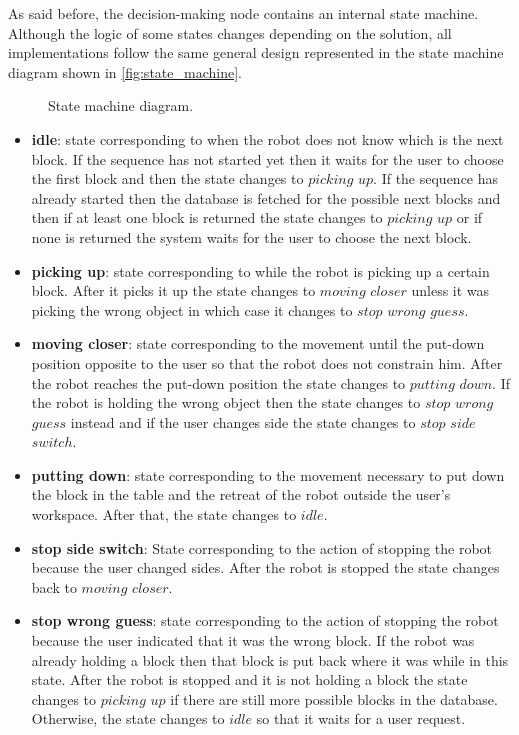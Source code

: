 As said before, the decision-making node contains an internal state machine. Although the logic of some states changes depending on the solution, all implementations follow the same general design represented in the state machine diagram shown in \autoref{fig:state_machine}.
\begin{figure}[ht]
    \centering
    
    \caption{State machine diagram.}
    \label{fig:state_machine}
\end{figure}
\begin{itemize}
    \item \textbf{idle}: state corresponding to when the robot does not know which is the next block. If the sequence has not started yet then it waits for the user to choose the first block and then the state changes to $picking$ $up$. If the sequence has already started then the database is fetched for the possible next blocks and then if at least one block is returned the state changes to $picking$ $up$ or if none is returned the system waits for the user to choose the next block.
    \item \textbf{picking up}: state corresponding to while the robot is picking up a certain block. After it picks it up the state changes to $moving$ $closer$ unless it was picking the wrong object in which case it changes to $stop$ $wrong$ $guess$.
    \item \textbf{moving closer}: state corresponding to the movement until the put-down position opposite to the user so that the robot does not constrain him. After the robot reaches the put-down position the state changes to $putting$ $down$. If the robot is holding the wrong object then the state changes to $stop$ $wrong$ $guess$ instead and if the user changes side the state changes to $stop$ $side$ $switch$.
    \item \textbf{putting down}: state corresponding to the movement necessary to put down the block in the table and the retreat of the robot outside the user's workspace. After that, the state changes to $idle$.
    \item \textbf{stop side switch}: State corresponding to the action of stopping the robot because the user changed sides. After the robot is stopped the state changes back to $moving$ $closer$.
    \item \textbf{stop wrong guess}: state corresponding to the action of stopping the robot because the user indicated that it was the wrong block. If the robot was already holding a block then that block is put back where it was while in this state. After the robot is stopped and it is not holding a block the state changes to $picking$ $up$ if there are still more possible blocks in the database. Otherwise, the state changes to $idle$ so that it waits for a user request.
\end{itemize}


